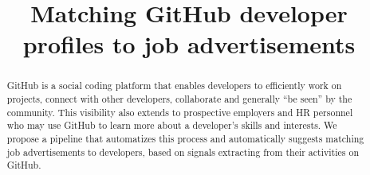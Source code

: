 \documentclass[conference]{IEEEtran}
\begin{document}
\newcommand{\ghtorrent}{ \textsc{ght}orrent\xspace}
\newcommand{\api}{\textsc{api}\xspace}

\newcommand{\nb}[3]{
  \fcolorbox{black}{#2}{\bfseries\sffamily\scriptsize#1}
    {\sf\small$\blacktriangleright$\textit{#3}$\blacktriangleleft$}
}

\newcommand\georgios[1]{\nb{Georgios}{yellow}{#1}}
\newcommand\claudia[1]{\nb{Claudia}{cyan}{#1}}
\newcommand\annotate[1]{\hfill \setlength{\fboxsep}{1pt} \colorbox{NavyBlue}{\color{white}[{#1}]}}
\newcommand\annotateG[1]{\hfill \setlength{\fboxsep}{1pt} \colorbox{BrickRed}{\color{white}[{#1}]}}


\newcommand{\hassanbox}[1]
{
  \vspace{0.29em}
  \noindent
  \fbox{
  \begin{minipage}{0.46\textwidth}
    \emph{\noindent #1}
    \end{minipage}
}}

\newcommand{\resp}[2]{{\sc R#1:} ``\emph{#2}''}
\newcommand{\respnum}[1]{{\sc R#1}}
\newcommand{\code}[1]{{\textsl{#1}}}

\title{Matching GitHub developer profiles to job advertisements}

\author{
\and
{}
}

\maketitle

\begin{abstract}

GitHub is a social coding platform that enables developers to efficiently work
on projects, connect with other developers, collaborate and generally ``be
seen'' by the community. This visibility also extends to prospective employers
and HR personnel who may use GitHub to learn more about a developer's skills and
interests. We propose a pipeline that automatizes this process and automatically
suggests matching job advertisements to developers, based on signals extracting
from their activities on GitHub.

\end{abstract}
\end{document}
